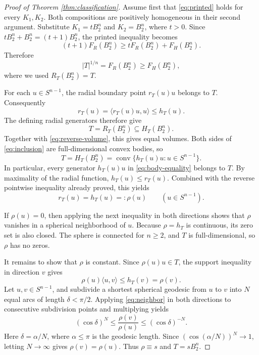 \documentclass[11pt]{article}
\newcommand{\conv}{\operatorname{conv}}
\newcommand{\Sph}{S^{n-1}}
\begin{document}
\begin{proof}[Proof of Theorem \ref{thm:classification}]
Assume first that \eqref{eq:printed} holds for every $K_1,K_2$.  Both
compositions are positively homogeneous in their second argument.  Substitute
$K_1=tB_2^n$ and $K_2=B_2^n$, where $t>0$.  Since
$tB_2^n+B_2^n=(t+1)B_2^n$, the printed inequality becomes
\[
 (t+1)F_R(B_2^n)\ge tF_R(B_2^n)+F_H(B_2^n).
\]
Therefore
\begin{equation}\label{eq:reverse-volume}
 |T|^{1/n}=F_R(B_2^n)\ge F_H(B_2^n),
\end{equation}
where we used $R_T(B_2^n)=T$.

For each $u\in\Sph$, the radial boundary point $r_T(u)u$ belongs to $T$.
Consequently
\[
 r_T(u)=\langle r_T(u)u,u\rangle\le h_T(u).
\]
The defining radial generators therefore give
\begin{equation}\label{eq:inclusion}
 T=R_T(B_2^n)\subseteq H_T(B_2^n).
\end{equation}
Together with \eqref{eq:reverse-volume}, this gives equal volumes.  Both sides
of \eqref{eq:inclusion} are full-dimensional convex bodies, so
\begin{equation}\label{eq:body-equality}
 T=H_T(B_2^n)=\conv\{h_T(u)u:u\in\Sph\}.
\end{equation}
In particular, every generator $h_T(u)u$ in \eqref{eq:body-equality} belongs
to $T$.  By maximality of the radial function, $h_T(u)\le r_T(u)$.  Combined
with the reverse pointwise inequality already proved, this yields
\begin{equation}\label{eq:radial-support}
 r_T(u)=h_T(u)=:\rho(u)\qquad(u\in\Sph).
\end{equation}

If $\rho(u)=0$, then applying the next inequality in both directions shows
that $\rho$ vanishes in a spherical neighborhood of $u$.  Because $\rho=h_T$
is continuous, its zero set is also closed.  The sphere is connected for
$n\ge2$, and $T$ is full-dimensional, so $\rho$ has no zeros.

It remains to show that $\rho$ is constant.  Since
$\rho(u)u\in T$, the support inequality in direction $v$ gives
\begin{equation}\label{eq:neighbor}
 \rho(u)\langle u,v\rangle\le h_T(v)=\rho(v).
\end{equation}
Let $u,v\in\Sph$, and subdivide a shortest spherical geodesic from $u$ to
$v$ into $N$ equal arcs of length $\delta<\pi/2$.  Applying
\eqref{eq:neighbor} in both directions to consecutive subdivision points and
multiplying yields
\[
 (\cos\delta)^N
 \le \frac{\rho(v)}{\rho(u)}
 \le (\cos\delta)^{-N}.
\]
Here $\delta=\alpha/N$, where $\alpha\le\pi$ is the geodesic length.  Since
$(\cos(\alpha/N))^N\to1$, letting $N\to\infty$ gives
$\rho(v)=\rho(u)$.  Thus $\rho\equiv s$ and $T=sB_2^n$.


\end{proof}
\end{document}
